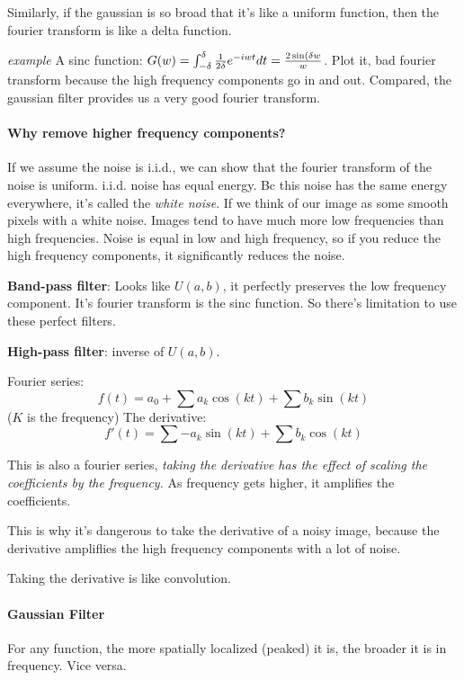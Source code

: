 Similarly, if the gaussian is so broad that it's like a uniform function, then
the fourier transform is like a delta function.

\emph{example} A sinc function: $G(w) = \int_{-\delta}^\delta \frac{1}{2\delta} e^{-iwt}
dt = \frac{2\sin(\delta w}{w}$. Plot it, bad fourier transform because
the high frequency components go in and out.
Compared, the gaussian filter provides us a very good fourier
transform.

\paragraph{Why remove  higher frequency components?}
\label{sec:why-remove-higher}
If we assume the noise is i.i.d., we can show that the fourier
transform of the noise is uniform. i.i.d. noise has equal energy. Bc
this noise has the same energy everywhere, it's called the \emph{white
noise}. If we think of our image as some smooth pixels with a white noise.
Images tend to have much more low frequencies than high
frequencies. Noise is equal in low and high frequency, so if you
reduce the high frequency components, it significantly reduces the
noise. 

\textbf{Band-pass filter}: Looks like $U(a,b)$, it perfectly preserves
the low frequency component. It's fourier transform is the sinc
function. So there's limitation to use these perfect filters.

\textbf{High-pass filter}: inverse of $U(a,b)$. 

Fourier series: $$f(t) = a_0 + \sum a_k \cos(k t) + \sum b_k
\sin(k t)$$ ($K$ is the frequency)
The derivative:$$f'(t) = \sum - a_k \sin(k t) + \sum b_k
\cos(k t)$$

This is also a fourier series, \emph{taking the derivative has the
effect of scaling the coefficients by the frequency.} As frequency gets
higher, it amplifies the coefficients. 

This is why it's dangerous to take the derivative of a noisy image,
because the derivative ampliflies the high frequency components with a
lot of noise. 

Taking the derivative is like convolution.

\paragraph{Gaussian Filter}
\label{sec:gaussian-filter}
For any function, the more spatially localized (peaked) it is, the
broader it is in frequency. Vice versa.

